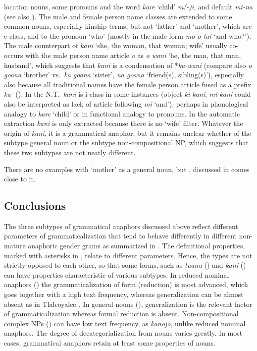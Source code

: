 \documentclass[output=collectionpaper]{langsci/langscibook}
\begin{document}
location nouns, some pronouns and the word \textit{kare} ‘child’ \textit{m(-)i}, and default \textit{mi-na} (see also \citealt[26]{Mellow2013}). The male and female person name classes are extended to some common nouns, especially kinship terms, but not ‘father’ and ‘mother’, which are e-class, and to the pronoun ‘who’ (mostly in the male form \textit{mo o-tai} ‘and who?’). The male counterpart of \textit{kani} ‘she, the woman, that woman; wife’ usually co-occurs with the male person name article \textit{o} as \textit{o wani} ‘he, the man, that man, husband’, which suggests that \textit{kani} is a condensation of *\textit{ka-wani} (compare also \textit{o goana} ‘brother’ vs.\ \textit{ka goana} ‘sister’, \textit{na goana} ‘friend(s), sibling(s)’), especially also because all traditional  names have the female person article fused as a prefix \textit{ka-} (\citealt[20]{Mellow2013}). In the N.T.\ \textit{kani} is i-class in some instances (object \textit{ki kani}; \textit{mi kani} could also be interpreted as lack of article following \textit{mi} ‘and’), perhaps in phonological analogy to \textit{kare} ‘child’ or in functional analogy to pronouns. In the automatic extraction \textit{kani} is only extracted because there is no ‘wife’ filter. Whatever the origin of \textit{kani}, it is a grammatical anaphor, but it remains unclear whether of the subtype general noun or the subtype non-compositional NP, which suggests that these two subtypes are not neatly different.

There are no examples with ‘mother’ as a general noun, but , discussed in  comes close to it.


\subsection{Conclusions}
\label{sec:BW:5.5}

The three subtypes of grammatical anaphors discussed above reflect different parameters of grammaticalization that tend to behave differently in different non-mature anaphoric gender grams as summarized in . The definitional properties, marked with asterisks in , relate to different parameters. Hence, the types are not strictly opposed to each other, so that some forms, such as  \textit{tuanu} () and  \textit{kani} () can have properties characteristic of various subtypes. In reduced nominal anaphors () the grammaticalization of form (reduction) is most advanced, which goes together with a high text frequency, whereas generalization can be almost absent as in Tlalcoyalco . In general nouns (), generalization is the relevant factor of grammaticalization whereas formal reduction is absent. Non-compositional complex NPs () can have low text frequency, as  \textit{kanojo}, unlike reduced nominal anaphors. The degree of decategorialization from nouns varies greatly. In most cases, grammatical anaphors retain at least some properties of nouns.
\end{document}
